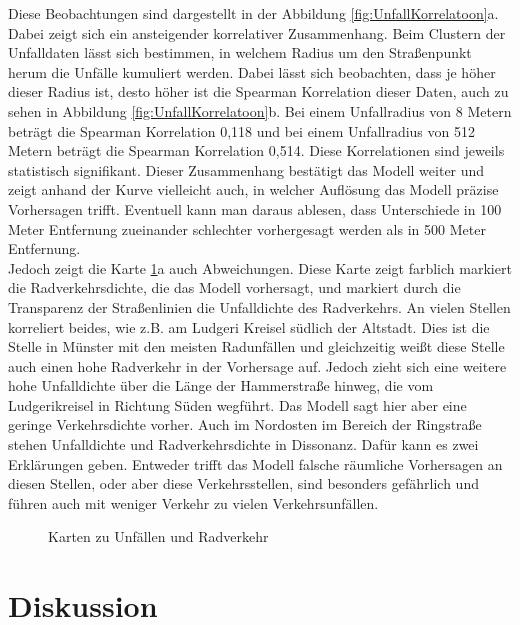 \documentclass[a4paper,12pt]{thesis}
\begin{document}
Diese Beobachtungen sind dargestellt in der Abbildung \ref{fig:UnfallKorrelatoon}a. Dabei zeigt sich ein ansteigender korrelativer Zusammenhang. Beim Clustern der Unfalldaten lässt sich bestimmen, in welchem Radius um den Straßenpunkt herum die Unfälle kumuliert werden. Dabei lässt sich beobachten, dass je höher dieser Radius ist, desto höher ist die Spearman Korrelation dieser Daten, auch zu sehen in Abbildung \ref{fig:UnfallKorrelatoon}b. Bei einem Unfallradius von 8 Metern beträgt die Spearman Korrelation 0,118 und bei einem Unfallradius von 512 Metern beträgt die Spearman Korrelation 0,514. Diese Korrelationen sind jeweils statistisch signifikant. Dieser Zusammenhang bestätigt das Modell weiter und zeigt anhand der Kurve vielleicht auch, in welcher Auflösung das Modell präzise Vorhersagen trifft. Eventuell kann man daraus ablesen, dass Unterschiede in 100 Meter Entfernung zueinander schlechter vorhergesagt werden als in 500 Meter Entfernung.\\
Jedoch zeigt die Karte \ref{fig:Unfallkarten}a auch Abweichungen. Diese Karte zeigt farblich markiert die Radverkehrsdichte, die das Modell vorhersagt, und markiert durch die Transparenz der Straßenlinien die Unfalldichte des Radverkehrs. An vielen Stellen korreliert beides, wie z.B. am Ludgeri Kreisel südlich der Altstadt. Dies ist die Stelle in Münster mit den meisten Radunfällen und gleichzeitig weißt diese Stelle auch einen hohe Radverkehr in der Vorhersage auf. Jedoch zieht sich eine weitere hohe Unfalldichte über die Länge der Hammerstraße hinweg, die vom Ludgerikreisel in Richtung Süden wegführt. Das Modell sagt hier aber eine geringe Verkehrsdichte vorher. Auch im Nordosten im Bereich der Ringstraße stehen Unfalldichte und Radverkehrsdichte in Dissonanz. Dafür kann es zwei Erklärungen geben. Entweder trifft das Modell falsche räumliche Vorhersagen an diesen Stellen, oder aber diese Verkehrsstellen, sind besonders gefährlich und führen auch mit weniger Verkehr zu vielen Verkehrsunfällen.

\begin{figure}%
	\centering
	
	\caption{Karten zu Unfällen und Radverkehr}%
	\label{fig:Unfallkarten}%
\end{figure}

\chapter{Diskussion}
\end{document}
